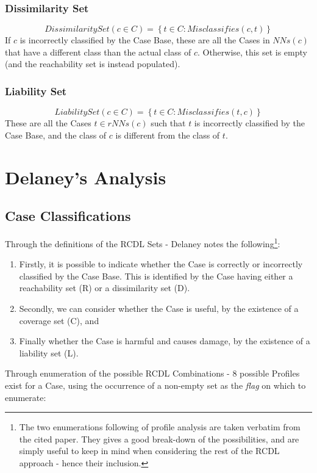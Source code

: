 \documentclass[a4paper,11pt]{report}
\begin{document}
\subsubsection{Dissimilarity Set}
\[ DissimilaritySet(c \in C) = \left\lbrace t \in C : Misclassifies(c, t) \right\rbrace \]  
If $c$ is incorrectly classified by the Case Base, these are all the Cases in $ NNs(c) $ that have a different class than the actual class of $c$. Otherwise, this set is empty (and the reachability set is instead populated).

\subsubsection{Liability Set}
\[ LiabilitySet(c \in C) = \left\lbrace t \in C : Misclassifies(t, c) \right\rbrace \]  
These are all the Cases $ t \in rNNs(c) $ such that $t$ is incorrectly classified by the Case Base, and the class of $c$ is different from the class of $t$.

\section{Delaney's Analysis}

\subsection{Case Classifications}
Through the definitions of the RCDL Sets - Delaney notes the following\cite{Delany2009}\footnote{The two enumerations following of profile analysis are taken verbatim from the cited paper. They gives a good break-down of the possibilities, and are simply useful to keep in mind when considering the rest of the RCDL approach - hence their inclusion.}:

\begin{enumerate}
	\item Firstly, it is possible to indicate whether the Case is correctly or incorrectly classified by the Case Base. This is identified by the Case having either a reachability set (R) or a dissimilarity set (D).
	\item Secondly, we can consider whether the Case is useful, by the existence of a coverage set (C), and
	\item Finally whether the Case is harmful and causes damage, by the existence of a liability set (L).
\end{enumerate}

Through enumeration of the possible RCDL Combinations - 8 possible Profiles exist for a Case, using the occurrence of a non-empty set as the \emph{flag} on which to enumerate\cite{Delany2009}:
\end{document}

